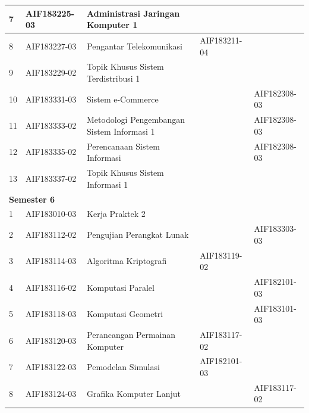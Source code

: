 \begin{table}[H]
\begin{tabular}{|p{0.5cm}|p{2.85cm}|p{4.95cm}|p{2.7cm}|p{2.7cm}|}
7 & AIF183225-03 & Administrasi Jaringan Komputer 1 &  &  \\ \hline
8 & AIF183227-03 & Pengantar Telekomunikasi & AIF183211-04 &  \\ \hline
9 & AIF183229-02 & Topik Khusus Sistem Terdistribusi 1 &  &  \\ \hline
10 & AIF183331-03 & Sistem e-Commerce &  & AIF182308-03 \\ \hline
11 & AIF183333-02 & Metodologi Pengembangan Sistem Informasi 1 &  & AIF182308-03 \\ \hline
12 & AIF183335-02 & Perencanaan Sistem Informasi &  & AIF182308-03 \\ \hline
13 & AIF183337-02 & Topik Khusus Sistem Informasi 1 &  &  \\ \hline
\multicolumn{5}{|l|}{\textbf{Semester 6}} \\ \hline
1 & AIF183010-03 & Kerja Praktek 2 &  &  \\ \hline
2 & AIF183112-02 & Pengujian Perangkat Lunak &  & AIF183303-03 \\ \hline
3 & AIF183114-03 & Algoritma Kriptografi & AIF183119-02 &  \\ \hline
4 & AIF183116-02 & Komputasi Paralel &  & AIF182101-03 \\ \hline
5 & AIF183118-03 & Komputasi Geometri &  & AIF183101-03 \\ \hline
6 & AIF183120-03 & Perancangan Permainan Komputer & AIF183117-02 &  \\ \hline
7 & AIF183122-03 & Pemodelan Simulasi & AIF182101-03 &  \\ \hline
8 & AIF183124-03 & Grafika Komputer Lanjut &  & AIF183117-02 \\ \hline
					\end{tabular}
	\label{tab:DaftarMataKuliahPilihanDanPrasyaratnya}
\end{table}


